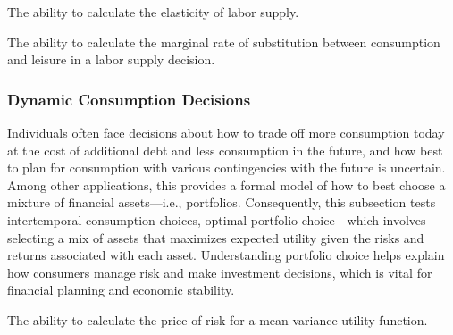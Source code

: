 
\begin{el}
    {The ability to calculate the elasticity of labor supply.}
\end{el}

\begin{el}
    {The ability to calculate the marginal rate of substitution between consumption and leisure in a labor supply decision.}
\end{el}




\subsubsection{Dynamic Consumption Decisions}\label{mod:portfolio_choice}
Individuals often face decisions about how to trade off more consumption today at the cost of additional debt and less consumption in the future, and how best to plan for consumption with various contingencies with the future is uncertain.  Among other applications, this provides a formal model of how to best choose a mixture of financial assets---i.e., portfolios. Consequently, this subsection tests intertemporal consumption choices, optimal portfolio choice---which involves selecting a mix of assets that maximizes expected utility given the risks and returns associated with each asset. Understanding portfolio choice helps explain how consumers manage risk and make investment decisions, which is vital for financial planning and economic stability.

\begin{el}
{The ability to calculate the price of risk for a mean-variance utility function.}
\end{el}

